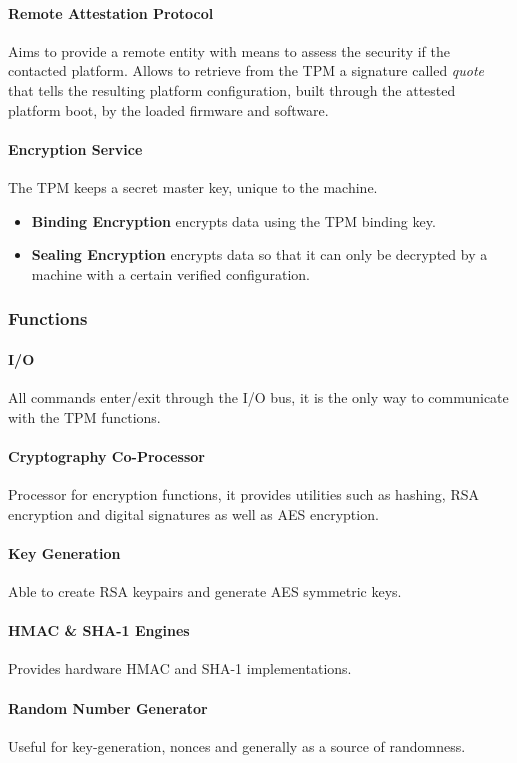 \paragraph{Remote Attestation Protocol}
Aims to provide a remote entity with means to assess the security if the contacted platform.
Allows to retrieve from the TPM a signature called \textit{quote} that tells the resulting platform configuration,
built through the attested platform boot, by the loaded firmware and software.

\paragraph{Encryption Service}
The TPM keeps a secret master key, unique to the machine.
\begin{itemize}
    \item \textbf{Binding Encryption} encrypts data using the TPM binding key.
    \item \textbf{Sealing Encryption} encrypts data so that it can only be decrypted by a machine with a certain verified configuration.
\end{itemize}

\subsubsection{Functions}
\paragraph{I/O}
All commands enter/exit through the I/O bus, it is the only way to communicate with the TPM functions.
\paragraph{Cryptography Co-Processor}
Processor for encryption functions, it provides utilities such as hashing, RSA encryption and digital signatures
as well as AES encryption.
\paragraph{Key Generation}
Able to create RSA keypairs and generate AES symmetric keys.
\paragraph{HMAC \& SHA-1 Engines}
Provides hardware HMAC and SHA-1 implementations.
\paragraph{Random Number Generator}
Useful for key-generation, nonces and generally as a source of randomness.
